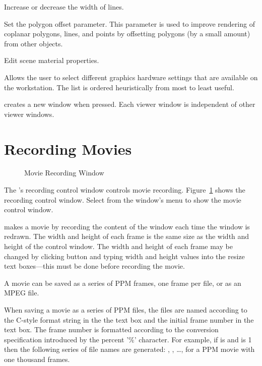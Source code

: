 \begin{description}
\begin{description}
     Increase or decrease the width of lines.
    
     Set the polygon offset parameter.
    This parameter is used to improve rendering of coplanar
    polygons, lines, and points by offsetting polygons (by a small
    amount) from other objects.

     Edit scene material properties.
  \end{description}

   Allows the user to select different
  graphics hardware settings that are available on the workstation.
  The list is ordered heuristically from most to least useful.

    creates a new \viewer{}
  window when pressed.  Each viewer window is independent of other
  viewer windows.
\end{description}

\section{Recording Movies}
\label{sec:recordmovies} 

\begin{figure}[htb]
  \begin{makeimage}
  \end{makeimage}
  \recordmoviewin
  \caption{\label{fig:recordmoviewin} Movie Recording Window}
\end{figure}

The \viewer{}'s recording control window controls movie recording.
Figure~\ref{fig:recordmoviewin} shows the recording control window.
Select  from the \viewer{} window's
 menu to show the movie control window.

\sr{} makes a movie by recording the content of the \viewer{} window
each time the \viewer{} window is redrawn.  The width and height of
each frame is the same size as the width and height of the \viewer{}
control window.  The width and height of each frame may be changed by
clicking button  and typing width and height values
into the resize text boxes---this must be done before recording the
movie.

A movie can be saved as a series of PPM frames, one frame per
file,  or as an MPEG file.

When saving a movie as a series of PPM files, the files are named
according to the C-style format string in the the 
text box and the initial frame number in the  text
box.  The frame number is formatted according to the conversion
specification introduced by the percent '\%' character.  For example,
if  is  and  is 1
then the following series of file names are generated:
, , \ldots,
 for a PPM movie with one thousand frames.

